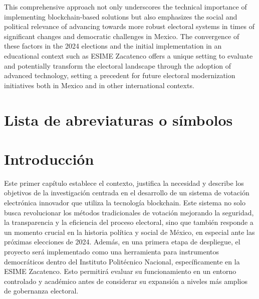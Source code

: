 \documentclass{report}
\begin{document}
	This comprehensive approach not only underscores the technical importance of implementing blockchain-based solutions but also emphasizes the social and political relevance of advancing towards more robust electoral systems in times of significant changes and democratic challenges in Mexico. The convergence of these factors in the 2024 elections and the initial implementation in an educational context such as ESIME Zacatenco offers a unique setting to evaluate and potentially transform the electoral landscape through the adoption of advanced technology, setting a precedent for future electoral modernization initiatives both in Mexico and in other international contexts.
	
	\newpage
	\renewcommand{\listtablename}{Lista de tablas}
	\listoftables
	\newpage
	
	\renewcommand{\listfigurename}{Lista de figuras}
	\listoffigures
	\newpage
	
	\renewcommand{\lstlistlistingname}{Lista de Códigos de Ejemplos}
	\lstlistoflistings
	\newpage
	
	\chapter*{Lista de abreviaturas o símbolos}
	
	\chapter{Introducción}
	
	Este primer capítulo establece el contexto, justifica la necesidad y describe los objetivos de la investigación centrada en el desarrollo de un sistema de votación electrónica innovador que utiliza la tecnología blockchain. Este sistema no solo busca revolucionar los métodos tradicionales de votación mejorando la seguridad, la transparencia y la eficiencia del proceso electoral, sino que también responde a un momento crucial en la historia política y social de México, en especial ante las próximas elecciones de 2024. Además, en una primera etapa de despliegue, el proyecto será implementado como una herramienta para instrumentos democráticos dentro del Instituto Politécnico Nacional, específicamente en la ESIME Zacatenco. Esto permitirá evaluar su funcionamiento en un entorno controlado y académico antes de considerar su expansión a niveles más amplios de gobernanza electoral.
	
\end{document}
